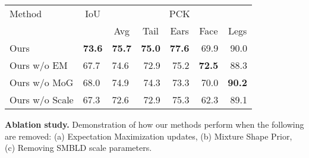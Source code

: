 \small
\centering
\begin{tabular}{@{}lllrrrr@{}}
\toprule
\multicolumn{1}{l}{Method} & 
\multicolumn{1}{c}{IoU} & 
\multicolumn{5}{c}{PCK} \\
\multicolumn{2}{c}{} &
\multicolumn{1}{c}{Avg} &
\multicolumn{1}{c}{Tail} &
\multicolumn{1}{c}{Ears} &
\multicolumn{1}{c}{Face} &
\multicolumn{1}{c}{Legs} \\
\midrule
Ours & \textbf{73.6} & \textbf{75.7} & \textbf{75.0} & \textbf{77.6} & 69.9 & 90.0 \\
Ours w/o EM & 67.7 & 74.6 & 72.9 & 75.2 & \textbf{72.5} & 88.3 \\
Ours w/o MoG & 68.0 & 74.9 & 74.3 & 73.3 & 70.0 & \textbf{90.2} \\ 
Ours w/o Scale & 67.3 & 72.6 & 72.9 & 75.3 & 62.3 & 89.1 \\
\bottomrule 
\end{tabular}
\caption{\label{tab:ablation}\textbf{Ablation study.} Demonstration of how our methods perform when the following are removed: (a) Expectation Maximization updates, (b) Mixture Shape Prior, (c) Removing SMBLD scale parameters.}